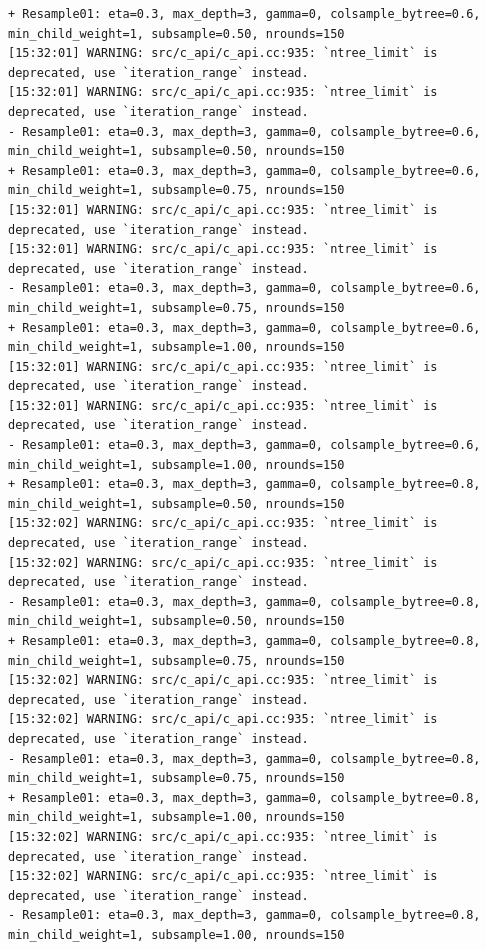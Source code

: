 \documentclass[
  letterpaper,
  DIV=11,
  numbers=noendperiod]{scrartcl}
\begin{document}
\begin{verbatim}
+ Resample01: eta=0.3, max_depth=3, gamma=0, colsample_bytree=0.6, min_child_weight=1, subsample=0.50, nrounds=150 
[15:32:01] WARNING: src/c_api/c_api.cc:935: `ntree_limit` is deprecated, use `iteration_range` instead.
[15:32:01] WARNING: src/c_api/c_api.cc:935: `ntree_limit` is deprecated, use `iteration_range` instead.
- Resample01: eta=0.3, max_depth=3, gamma=0, colsample_bytree=0.6, min_child_weight=1, subsample=0.50, nrounds=150 
+ Resample01: eta=0.3, max_depth=3, gamma=0, colsample_bytree=0.6, min_child_weight=1, subsample=0.75, nrounds=150 
[15:32:01] WARNING: src/c_api/c_api.cc:935: `ntree_limit` is deprecated, use `iteration_range` instead.
[15:32:01] WARNING: src/c_api/c_api.cc:935: `ntree_limit` is deprecated, use `iteration_range` instead.
- Resample01: eta=0.3, max_depth=3, gamma=0, colsample_bytree=0.6, min_child_weight=1, subsample=0.75, nrounds=150 
+ Resample01: eta=0.3, max_depth=3, gamma=0, colsample_bytree=0.6, min_child_weight=1, subsample=1.00, nrounds=150 
[15:32:01] WARNING: src/c_api/c_api.cc:935: `ntree_limit` is deprecated, use `iteration_range` instead.
[15:32:01] WARNING: src/c_api/c_api.cc:935: `ntree_limit` is deprecated, use `iteration_range` instead.
- Resample01: eta=0.3, max_depth=3, gamma=0, colsample_bytree=0.6, min_child_weight=1, subsample=1.00, nrounds=150 
+ Resample01: eta=0.3, max_depth=3, gamma=0, colsample_bytree=0.8, min_child_weight=1, subsample=0.50, nrounds=150 
[15:32:02] WARNING: src/c_api/c_api.cc:935: `ntree_limit` is deprecated, use `iteration_range` instead.
[15:32:02] WARNING: src/c_api/c_api.cc:935: `ntree_limit` is deprecated, use `iteration_range` instead.
- Resample01: eta=0.3, max_depth=3, gamma=0, colsample_bytree=0.8, min_child_weight=1, subsample=0.50, nrounds=150 
+ Resample01: eta=0.3, max_depth=3, gamma=0, colsample_bytree=0.8, min_child_weight=1, subsample=0.75, nrounds=150 
[15:32:02] WARNING: src/c_api/c_api.cc:935: `ntree_limit` is deprecated, use `iteration_range` instead.
[15:32:02] WARNING: src/c_api/c_api.cc:935: `ntree_limit` is deprecated, use `iteration_range` instead.
- Resample01: eta=0.3, max_depth=3, gamma=0, colsample_bytree=0.8, min_child_weight=1, subsample=0.75, nrounds=150 
+ Resample01: eta=0.3, max_depth=3, gamma=0, colsample_bytree=0.8, min_child_weight=1, subsample=1.00, nrounds=150 
[15:32:02] WARNING: src/c_api/c_api.cc:935: `ntree_limit` is deprecated, use `iteration_range` instead.
[15:32:02] WARNING: src/c_api/c_api.cc:935: `ntree_limit` is deprecated, use `iteration_range` instead.
- Resample01: eta=0.3, max_depth=3, gamma=0, colsample_bytree=0.8, min_child_weight=1, subsample=1.00, nrounds=150 

\end{verbatim}
\end{document}
